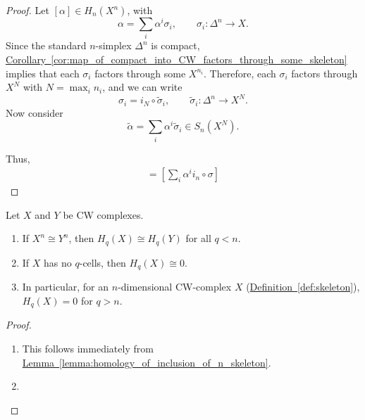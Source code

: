 \documentclass[main.tex]{subfiles}
\begin{document}
\begin{proof}
  Let $[\alpha] \in H_{n}(X^{n})$, with
  \begin{equation*}
    \alpha = \sum_{i} \alpha^{i} \sigma_{i},\qquad \sigma_{i}\colon \Delta^{n} \to X.
  \end{equation*}
  Since the standard $n$-simplex $\Delta^{n}$ is compact, \hyperref[cor:map_of_compact_into_CW_factors_through_some_skeleton]{Corollary~\ref*{cor:map_of_compact_into_CW_factors_through_some_skeleton}} implies that each $\sigma_{i}$ factors through some $X^{n_{i}}$. Therefore, each $\sigma_{i}$ factors through $X^{N}$ with $N = \max_{i} n_{i}$, and we can write
  \begin{equation*}
    \sigma_{i} = i_{N} \circ \tilde{\sigma}_{i},\qquad \tilde{\sigma}_{i}\colon \Delta^{n} \to X^{N}.
  \end{equation*}
  Now consider
  \begin{equation*}
    \tilde{\alpha} = \sum_{i} \alpha^{i} \tilde{\sigma}_{i} \in S_{n}(X^{N}).
  \end{equation*}

  Thus,
  \begin{align*}
    [\alpha] = \left[ \sum_{i} \alpha^{i} i_{n} \circ \sigma \right]
  \end{align*}
\end{proof}

\begin{corollary}
  Let $X$ and $Y$ be CW complexes.
  \begin{enumerate}
    \item If $X^{n} \cong Y^{n}$, then $H_{q}(X) \cong H_{q}(Y)$ for all $q < n$.

    \item If $X$ has no $q$-cells, then $H_{q}(X) \cong 0$.

    \item In particular, for an $n$-dimensional CW-complex $X$ (\hyperref[def:skeleton]{Definition~\ref*{def:skeleton}}), $H_{q}(X) = 0$ for $q > n$.
  \end{enumerate}
\end{corollary}
\begin{proof}
  \leavevmode
  \begin{enumerate}
    \item This follows immediately from \hyperref[lemma:homology_of_inclusion_of_n_skeleton]{Lemma~\ref*{lemma:homology_of_inclusion_of_n_skeleton}}.

    \item
  \end{enumerate}
\end{proof}
\end{document}
